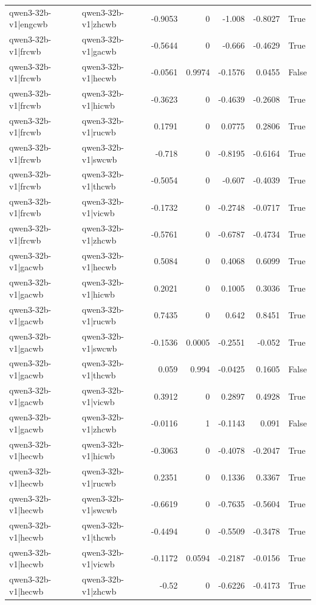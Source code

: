 \begin{table}
\begin{tabular}{l l r r r r l}
qwen3-32b-v1|engcwb & qwen3-32b-v1|zhcwb & -0.9053 & 0 & -1.008 & -0.8027 & True \\
qwen3-32b-v1|frcwb & qwen3-32b-v1|gacwb & -0.5644 & 0 & -0.666 & -0.4629 & True \\
qwen3-32b-v1|frcwb & qwen3-32b-v1|hecwb & -0.0561 & 0.9974 & -0.1576 & 0.0455 & False \\
qwen3-32b-v1|frcwb & qwen3-32b-v1|hicwb & -0.3623 & 0 & -0.4639 & -0.2608 & True \\
qwen3-32b-v1|frcwb & qwen3-32b-v1|rucwb & 0.1791 & 0 & 0.0775 & 0.2806 & True \\
qwen3-32b-v1|frcwb & qwen3-32b-v1|swcwb & -0.718 & 0 & -0.8195 & -0.6164 & True \\
qwen3-32b-v1|frcwb & qwen3-32b-v1|thcwb & -0.5054 & 0 & -0.607 & -0.4039 & True \\
qwen3-32b-v1|frcwb & qwen3-32b-v1|vicwb & -0.1732 & 0 & -0.2748 & -0.0717 & True \\
qwen3-32b-v1|frcwb & qwen3-32b-v1|zhcwb & -0.5761 & 0 & -0.6787 & -0.4734 & True \\
qwen3-32b-v1|gacwb & qwen3-32b-v1|hecwb & 0.5084 & 0 & 0.4068 & 0.6099 & True \\
qwen3-32b-v1|gacwb & qwen3-32b-v1|hicwb & 0.2021 & 0 & 0.1005 & 0.3036 & True \\
qwen3-32b-v1|gacwb & qwen3-32b-v1|rucwb & 0.7435 & 0 & 0.642 & 0.8451 & True \\
qwen3-32b-v1|gacwb & qwen3-32b-v1|swcwb & -0.1536 & 0.0005 & -0.2551 & -0.052 & True \\
qwen3-32b-v1|gacwb & qwen3-32b-v1|thcwb & 0.059 & 0.994 & -0.0425 & 0.1605 & False \\
qwen3-32b-v1|gacwb & qwen3-32b-v1|vicwb & 0.3912 & 0 & 0.2897 & 0.4928 & True \\
qwen3-32b-v1|gacwb & qwen3-32b-v1|zhcwb & -0.0116 & 1 & -0.1143 & 0.091 & False \\
qwen3-32b-v1|hecwb & qwen3-32b-v1|hicwb & -0.3063 & 0 & -0.4078 & -0.2047 & True \\
qwen3-32b-v1|hecwb & qwen3-32b-v1|rucwb & 0.2351 & 0 & 0.1336 & 0.3367 & True \\
qwen3-32b-v1|hecwb & qwen3-32b-v1|swcwb & -0.6619 & 0 & -0.7635 & -0.5604 & True \\
qwen3-32b-v1|hecwb & qwen3-32b-v1|thcwb & -0.4494 & 0 & -0.5509 & -0.3478 & True \\
qwen3-32b-v1|hecwb & qwen3-32b-v1|vicwb & -0.1172 & 0.0594 & -0.2187 & -0.0156 & True \\
qwen3-32b-v1|hecwb & qwen3-32b-v1|zhcwb & -0.52 & 0 & -0.6226 & -0.4173 & True \\

\end{tabular}
\end{table}
